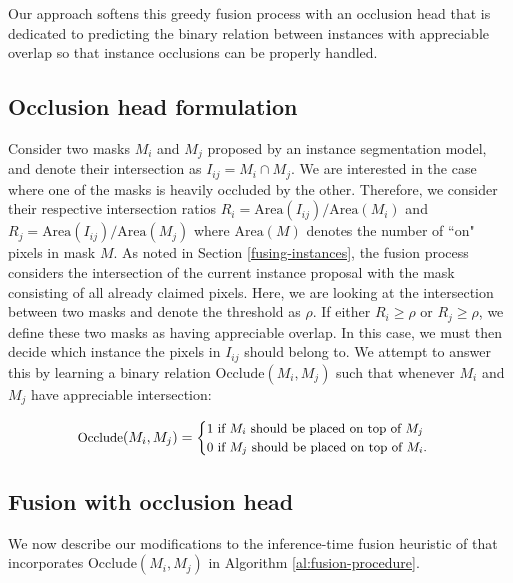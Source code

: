 \documentclass[10pt,twocolumn,letterpaper]{article}
\begin{document}
Our approach softens this greedy fusion process with an occlusion head that is dedicated to predicting the binary relation between instances with appreciable overlap so that instance occlusions can be properly handled.

\subsection{Occlusion head formulation}

Consider two masks $M_i$ and $M_j$ proposed by an instance segmentation model, and denote their intersection as $I_{ij} = M_i \cap M_j$. We are interested in the case where one of the masks is heavily occluded by the other. Therefore, we consider their respective intersection ratios $R_i = \text{Area}(I_{ij}) / \text{Area}(M_i)$ and $R_j = \text{Area}(I_{ij}) / \text{Area}(M_j)$ where $\text{Area}(M)$ denotes the number of ``on" pixels in mask $M$. As noted in Section \ref{fusing-instances}, the fusion process considers the intersection of the current instance proposal with the mask consisting of all already claimed pixels. Here, we are looking at the intersection between two masks and denote the threshold as $\rho$. If either $R_i \geq \rho$ or $R_j \geq \rho$, we define these two masks as having appreciable overlap. In this case,  we must then decide which instance the pixels in $I_{ij}$ should belong to. We attempt to answer this by learning a binary relation $\text{Occlude}(M_i, M_j)$  such that whenever $M_i$ and $M_j$ have appreciable intersection:

\vspace{-5mm}
\begin{align}
\label{occlude_equation}
\small
\text{Occlude}(M_i, M_j) =
\begin{cases}
    1 \text{ if } M_i \text{ should be placed on top of } M_j \\
    0 \text{ if } M_j \text{ should be placed on top of } M_i.
\end{cases}
\end{align}
\vspace{-5mm}

\subsection{Fusion with occlusion head}
\label{fusion-with_occlusion}
We now describe our modifications to the inference-time fusion heuristic of \cite{kirillov2018panoptic} that incorporates $\text{Occlude}(M_i, M_j)$ in Algorithm \ref{al:fusion-procedure}.
\end{document}
